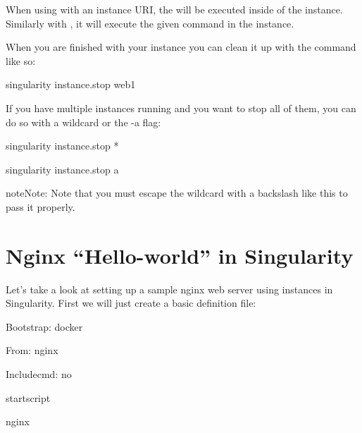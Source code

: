 \documentclass[letterpaper,10pt,english]{sphinxmanual}
\begin{document}
When using  with an instance URI, the  will be executed inside of the
instance. Similarly with , it will execute the given command in the
instance.

When you are finished with your instance you can clean it up with the
{\hyperref[\detokenize{appendix:instance-stop}]{}} command like so:

%
\begin{sphinxVerbatim}[commandchars=\\\{\}]
\PYGZdl{} singularity instance.stop web1
\end{sphinxVerbatim}

If you have multiple instances running and you want to stop all of
them, you can do so with a wildcard or the -a flag:

%
\begin{sphinxVerbatim}[commandchars=\\\{\}]
\PYGZdl{} singularity instance.stop \PYGZbs{}*

\PYGZdl{} singularity instance.stop \PYGZhy{}a
\end{sphinxVerbatim}

\begin{sphinxadmonition}{note}{Note:}
Note that you must escape the wildcard with a backslash like this \sphinxcode{\sphinxupquote{\textbackslash{}*}} to
pass it properly.
\end{sphinxadmonition}


\section{Nginx “Hello-world” in Singularity}
\label{\detokenize{running_services:nginx-hello-world-in-singularity}}
Let’s take a look at setting up a sample nginx web server using
instances in Singularity. First we will just create a basic definition
file:

%
\begin{sphinxVerbatim}[commandchars=\\\{\}]
Bootstrap: docker

From: nginx

Includecmd: no


\PYGZpc{}startscript

    nginx
\end{sphinxVerbatim}
\end{document}
